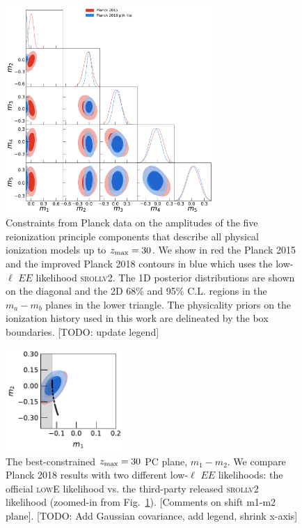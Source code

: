 \documentclass[prd,twocolumn,amsmath,amssymb,floatfix,superscriptaddress,nofootinbib]{revtex4-1}
\begin{document}
\begin{widetext}

\begin{figure}
\includegraphics[width=0.7\textwidth]{results/pc_results/plot_mj_triangle_t18_r12_t19_t20_vs_pl18_pc_zmax30_pliklite.pdf}
\caption{Constraints from Planck data on the amplitudes of the five reionization principle components that describe all physical ionization models up to $z_{\rm max} = 30$. We show in red the Planck 2015 and the improved Planck 2018 contours in blue which uses the low-$\ell$ $EE$ likelihood \textsc{srollv2}. The 1D posterior distributions are shown on the diagonal and the 2D 68\% and 95\% C.L. regions in the $m_a-m_b$ planes in the lower triangle. The physicality priors on the ionization history used in this work are delineated by the box boundaries. [TODO: update legend]}
\label{fig:plot_mjs_2018_vs_2015}
\end{figure}

\end{widetext}

\begin{figure}
\includegraphics[width=0.4\textwidth]{results/pc_results/plot_m1_m2_pl18_pc_zmax30_pliklite_srollv2_vs_pl18_pc_zmax30_pliklite_wTauTrajectory.pdf}
\caption{The best-constrained $z_{\rm max} = 30$ PC plane, $m_1-m_2$. We compare Planck 2018 results with two different low-$\ell$ $EE$ likelihoods: the official \textsc{lowE} likelihood vs. the third-party released \textsc{srollv2} likelihood (zoomed-in from Fig.~\ref{fig:plot_mjs_2018_vs_2015}). [Comments on shift m1-m2 plane]. [TODO: Add Gaussian covariance, add legend, shrink x-axis]
}
\label{fig:plot_m1m2}
\end{figure}
\end{document}

